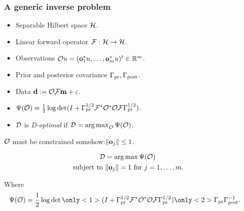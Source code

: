 \documentclass{beamer}
\begin{document}
\begin{frame}
\frametitle{A generic inverse problem}

\begin{itemize}
\item Separable Hilbert space \(\mathcal{H}\).
\item Linear forward operator \(\mathcal{F}: \mathcal{H} \to \mathcal{H}\).
\item Observations \(\mathcal{O} u = (\mathbf{o}_1^*u, \dots, \mathbf{o}_m^*u )^t \in \mathbb{R}^m\).
\item Prior and posterior covariance \( \Gamma_{\textup{pr}}, \Gamma_{\textup{post}}\).
\item Data \(\mathbf{d} := \mathcal{O} \mathcal{F} \mathbf{m} + \varepsilon\).
\item \(\Psi( \mathcal{O}) = \frac12 \log \det ( I + 
  \Gamma_{\textup{pr}}^{1/2} \mathcal{F} ^* \mathcal{O}^* \mathcal{O} \mathcal{F} \Gamma_{\textup{pr}}^{1/2})\).
\item \(\mathcal{D}\) is \emph{D-optimal} if \(\mathcal{D} = \operatorname*{arg\,max}_{\mathcal{O}}
  \Psi(\mathcal{O})\).
\end{itemize}

\pause \(\mathcal{O}\) must be constrained somehow:\pause \(\|\mathbf{o}_j\| \leq 1\).


\end{frame}

\begin{frame}
\begin{align*}
  \begin{split}
  \mathcal{D} &= \operatorname*{arg\,max}\Psi(\mathcal{O})\\
  \text{subject to }& \|\mathbf{o}_j\| = 1 \text{ for } j=1,\dots,m.
  \end{split}
\end{align*}

Where
\begin{align*}
  \begin{split}
    \tar(\obs) %
    &= \frac12 \log \det
    \only<1>{
      ( I + \prcov^{1/2} \fwd ^* \obs^* \obs \fwd \prcov^{1/2})
    }
    \only<2>{
    \prcov \postcov^{-1}
    }. 
  \end{split}
\end{align*}
\end{frame}
\end{document}
